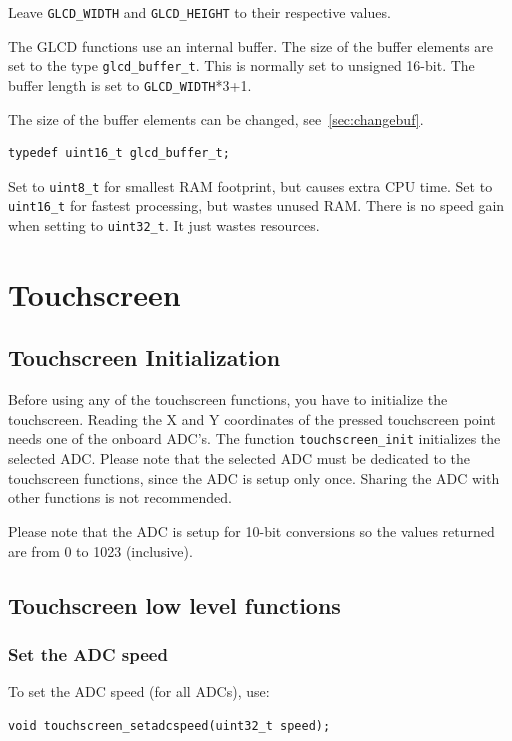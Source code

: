 \documentclass[12pt]{article}
\newcommand{\ifunc}[1]{\index{\texttt{#1}}}
\begin{document}
Leave \lstinline|GLCD_WIDTH| and \lstinline|GLCD_HEIGHT| to their respective values.

The GLCD functions use an internal buffer. The size of the buffer elements are set to the type \lstinline|glcd_buffer_t|. This is normally set to unsigned 16-bit. The buffer length is set to \lstinline|GLCD_WIDTH|*3+1.

The size of the buffer elements can be changed, see~\ref{sec:changebuf}.

\begin{lstlisting}
typedef uint16_t glcd_buffer_t;
\end{lstlisting}

Set to \lstinline|uint8_t| for smallest RAM footprint, but causes extra CPU time. Set to \lstinline|uint16_t| for fastest processing, but wastes unused RAM. There is no speed gain when setting to \lstinline|uint32_t|. It just wastes resources.

\section{Touchscreen}
\subsection{Touchscreen Initialization}
Before using any of the touchscreen functions, you have to initialize the touchscreen. Reading the X and Y coordinates of the pressed touchscreen point needs one of the onboard ADC's. The function \lstinline|touchscreen_init| initializes the selected ADC. Please note that the selected ADC must be dedicated to the touchscreen functions, since the ADC is setup only once. Sharing the ADC with other functions is not recommended.

Please note that the ADC is setup for 10-bit conversions so the values returned are from 0 to 1023 (inclusive).

\subsection{Touchscreen low level functions}

\subsubsection{Set the ADC speed}
\ifunc{touchscreen\_setadcspeed}
\label{sec:setadcspeed}
To set the ADC speed (for all ADCs), use:

\begin{lstlisting}
void touchscreen_setadcspeed(uint32_t speed);
\end{lstlisting}
\end{document}
